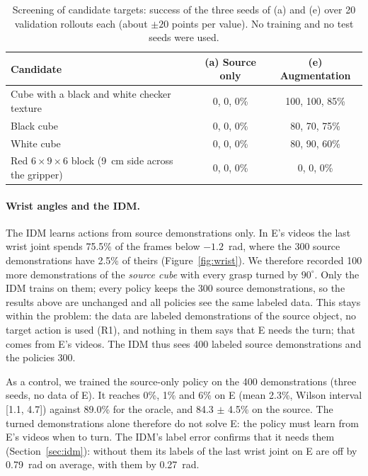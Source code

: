 \documentclass{article}
\begin{document}
\begin{table}[t]
  \caption{Screening of candidate targets: success of the three seeds of (a) and (e) over
  20 validation rollouts each (about $\pm 20$ points per value). No training and no test
  seeds were used.}
  \label{tab:screening}
  \centering
  \small
  \begin{tabular}{@{}lcc@{}}
    \toprule
    Candidate & (a) Source only & (e) Augmentation \\
    \midrule
    Cube with a black and white checker texture & 0, 0, 0\% & 100, 100, 85\% \\
    Black cube & 0, 0, 0\% & 80, 70, 75\% \\
    White cube & 0, 0, 0\% & 80, 90, 60\% \\
    Red $6 \times 9 \times 6$ block (9~cm side across the gripper) & 0, 0, 0\% & 0, 0, 0\% \\
    \bottomrule
  \end{tabular}
\end{table}

\paragraph{Wrist angles and the IDM.}
The IDM learns actions from source demonstrations only. In E's videos the last wrist joint
spends 75.5\% of the frames below $-1.2$~rad, where the 300 source demonstrations have
2.5\% of theirs (Figure~\ref{fig:wrist}). We therefore recorded 100 more demonstrations of
the \emph{source cube} with every grasp turned by $90^\circ$. Only the IDM trains on them;
every policy keeps the 300 source demonstrations, so the results above are unchanged and
all policies see the same labeled data. This stays within the problem: the data are
labeled demonstrations of the source object, no target action is used (R1), and nothing in
them says that E needs the turn; that comes from E's videos. The IDM thus sees 400 labeled
source demonstrations and the policies 300.

As a control, we trained the source-only policy on the 400 demonstrations (three seeds, no
data of E). It reaches 0\%, 1\% and 6\% on E (mean 2.3\%, Wilson interval [1.1, 4.7])
against 89.0\% for the oracle, and 84.3 $\pm$ 4.5\% on the source. The turned
demonstrations alone therefore do not solve E: the policy must learn from E's videos when
to turn. The IDM's label error confirms that it needs them (Section~\ref{sec:idm}):
without them its labels of the last wrist joint on E are off by 0.79~rad on average,
with them by 0.27~rad.
\end{document}
